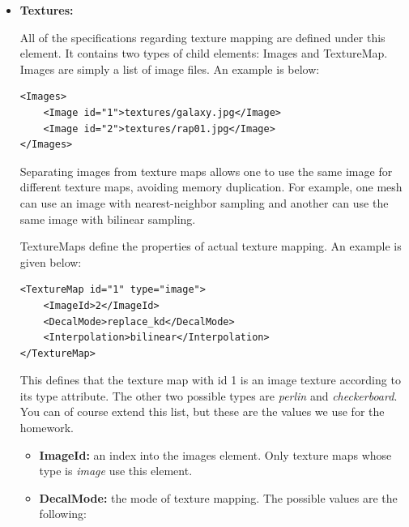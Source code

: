 \documentclass[12pt]{article}
\begin{document}
\begin{itemize}

\item \textbf{Textures:} 

All of the specifications regarding texture mapping are defined under
this element. It contains two types of child elements: Images and
TextureMap. Images are simply a list of image files. An example is
below:

\begin{verbatim}
<Images>
    <Image id="1">textures/galaxy.jpg</Image>
    <Image id="2">textures/rap01.jpg</Image>
</Images>
\end{verbatim}

Separating images from texture maps allows one to use the same image
for different texture maps, avoiding memory duplication. For example,
one mesh can use an image with nearest-neighbor sampling and another
can use the same image with bilinear sampling.

TextureMaps define the properties of actual texture mapping. An
example is given below:

\begin{verbatim}
<TextureMap id="1" type="image">
    <ImageId>2</ImageId>
    <DecalMode>replace_kd</DecalMode>
    <Interpolation>bilinear</Interpolation>
</TextureMap>
\end{verbatim}

This defines that the texture map with id 1 is an image texture
according to its type attribute. The other two possible types are
\emph{perlin} and \emph{checkerboard}.  You can of course extend this
list, but these are the values we use for the homework.

\begin{itemize}
\item \textbf{ImageId:} an index into the images element. Only texture
maps whose type is \emph{image} use this element.

\item \textbf{DecalMode:} the mode of texture mapping. The possible
values are the following:


\end{itemize}
\end{itemize}
\end{document}
